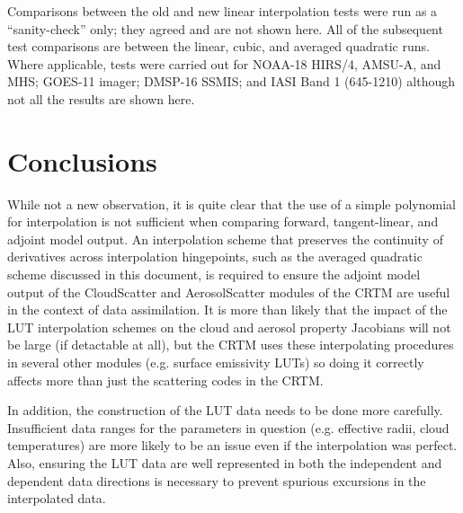 Comparisons between the old and new linear interpolation tests were run as a ``sanity-check'' only; they agreed and are not shown here. All of the subsequent test comparisons are between the linear, cubic, and averaged quadratic runs. Where applicable, tests were carried out for NOAA-18 HIRS/4, AMSU-A, and MHS; GOES-11 imager;  DMSP-16 SSMIS; and IASI Band 1 (645-1210\invcm) although not all the results are shown here. 









\section{Conclusions}
While not a new observation, it is quite clear that the use of a simple polynomial for interpolation is not sufficient when comparing forward, tangent-linear, and adjoint model output. An interpolation scheme that preserves the continuity of derivatives across interpolation hingepoints, such as the averaged quadratic scheme discussed in this document, is required to ensure the adjoint model output of the CloudScatter and AerosolScatter modules of the CRTM are useful in the context of data assimilation. It is more than likely that the impact of the LUT interpolation schemes on the cloud and aerosol property Jacobians will not be large (if detactable at all), but the CRTM uses these interpolating procedures in several other modules (e.g. surface emissivity LUTs) so doing it correctly affects more than just the scattering codes in the CRTM.

In addition, the construction of the LUT data needs to be done more carefully. Insufficient data ranges for the parameters in question (e.g. effective radii, cloud temperatures) are more likely to be an issue even if the interpolation was perfect. Also, ensuring the LUT data are well represented in both the independent and dependent data directions is necessary to prevent spurious excursions in the interpolated data.





%




